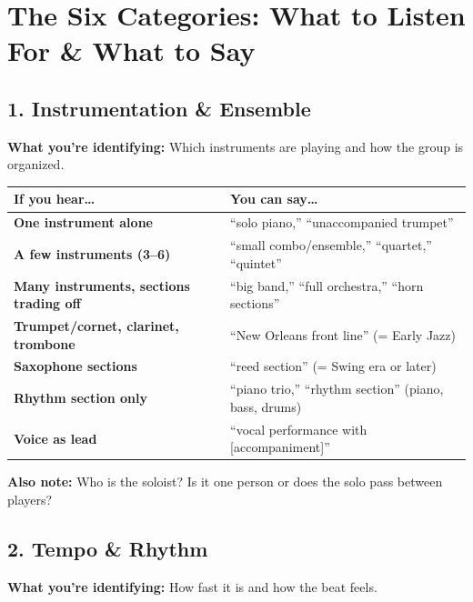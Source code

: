 \documentclass[11pt,letterpaper]{article}
\begin{document}
\section{The Six Categories: What to Listen For \& What to Say}

\subsection{1. Instrumentation \& Ensemble}

\textbf{What you're identifying:} Which instruments are playing and how the group is organized.

\renewcommand{\arraystretch}{1.3}
\begin{small}
\begin{tabularx}{\textwidth}{>{\bfseries}p{3cm} X}
\toprule
\textbf{If you hear\ldots} & \textbf{You can say\ldots} \\
\midrule
One instrument alone & ``solo piano,'' ``unaccompanied trumpet'' \\
A few instruments (3--6) & ``small combo/ensemble,'' ``quartet,'' ``quintet'' \\
Many instruments, sections trading off & ``big band,'' ``full orchestra,'' ``horn sections'' \\
Trumpet/cornet, clarinet, trombone & ``New Orleans front line'' (= Early Jazz) \\
Saxophone sections & ``reed section'' (= Swing era or later) \\
Rhythm section only & ``piano trio,'' ``rhythm section'' (piano, bass, drums) \\
Voice as lead & ``vocal performance with [accompaniment]'' \\
\bottomrule
\end{tabularx}
\end{small}

\textbf{Also note:} Who is the soloist? Is it one person or does the solo pass between players?

\subsection{2. Tempo \& Rhythm}

\textbf{What you're identifying:} How fast it is and how the beat feels.
\end{document}
